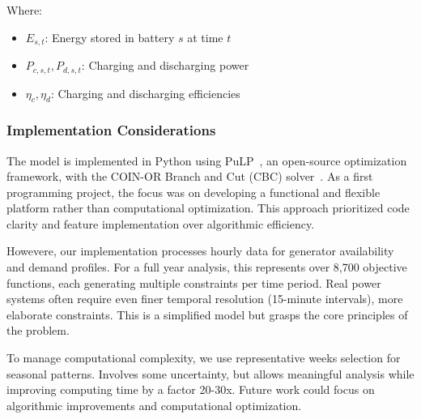 Where:
\begin{itemize}
    \item $E_{s,t}$: Energy stored in battery $s$ at time $t$
    \item $P_{c,s,t}, P_{d,s,t}$: Charging and discharging power
    \item $\eta_c, \eta_d$: Charging and discharging efficiencies
\end{itemize}

\subsubsection{Implementation Considerations}
The model is implemented in Python using PuLP~\cite{mitchell2011pulp}, an open-source optimization framework, 
with the COIN-OR Branch and Cut (CBC) solver~\cite{forrest2018cbc}. As a first programming project, the 
focus was on developing a functional and flexible platform rather than computational optimization. This 
approach prioritized code clarity and feature implementation over algorithmic efficiency.

Howevere, our implementation processes hourly data for generator availability and demand profiles. For a full
 year analysis, this represents over 8,700 objective functions, each generating multiple constraints per time
  period. Real power systems often require even finer temporal resolution (15-minute intervals), more 
  elaborate constraints. This is a simplified model but grasps the core principles of the problem.

To manage computational complexity, we use representative weeks selection for seasonal patterns. Involves 
some uncertainty, but allows meaningful analysis while improving computing time by a factor 20-30x. Future 
work could focus on algorithmic improvements and computational optimization.
